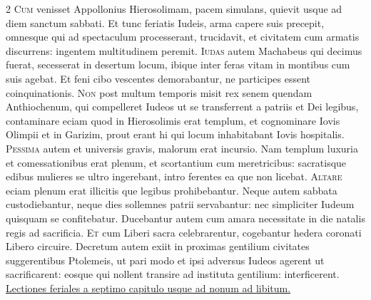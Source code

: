 \begin{multicols*}{2}
{\color{Red} }
\lettrine[lines=2]{\zallmancaps \color{Blue} C}{um} venisset Appollonius Hierosolimam, pacem simulans, quievit usque ad diem sanctum sabbati. Et tunc feriatis Iudeis, arma capere suis precepit, omnesque qui ad spectaculum processerant, trucidavit, et civitatem cum armatis discurrens: ingentem multitudinem peremit.
\lettrine[lines=2]{\zallmancaps \color{Red} I}{udas} autem Machabeus qui decimus fuerat, secesserat in desertum locum, ibique inter feras vitam in montibus cum suis agebat. Et feni cibo vescentes demorabantur, ne participes essent coinquinationis.
\lettrine[lines=2]{\zallmancaps \color{Blue} N}{on} post multum temporis misit rex senem quendam Anthiochenum, qui compelleret Iudeos ut se transferrent a patriis et Dei legibus, contaminare eciam quod in Hierosolimis erat templum, et cognominare Iovis Olimpii et in Garizim, prout erant hi qui locum inhabitabant Iovis hospitalis.
\lettrine[lines=2]{\zallmancaps \color{Red} P}{essima} autem et universis gravis, malorum erat incursio. Nam templum luxuria et comessationibus erat plenum, et scortantium cum meretricibus: sacratisque edibus mulieres se ultro ingerebant, intro ferentes ea que non licebat.
\lettrine[lines=2]{\zallmancaps \color{Blue} A}{ltare} eciam plenum erat illicitis que legibus prohibebantur. Neque autem sabbata custodiebantur, neque dies sollemnes patrii servabantur: nec simpliciter Iudeum quisquam se confitebatur. Ducebantur autem cum amara necessitate in die natalis regis ad sacrificia.
\lettrine[lines=2]{\zallmancaps \color{Red} E}{t} cum Liberi sacra celebrarentur, cogebantur hedera coronati Libero circuire. Decretum autem exiit in proximas gentilium civitates suggerentibus Ptolemeis, ut pari modo et ipsi adversus Iudeos agerent ut sacrificarent: eosque qui nollent transire ad instituta gentilium: interficerent.
\newline \ul{Lectiones feriales a septimo capitulo usque ad nonum ad libitum.}
{\color{Red} }

\end{multicols*}
